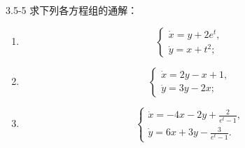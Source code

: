 \documentclass[UTF8,a4paper,11pt]{ctexart}
\begin{document}
\begin{problem}{3.5-5}
求下列各方程组的通解：
  \begin{enumerate}[label=(\arabic*)]
    \item
    \[
    \begin{cases}
      \dot x=y+2e^t,\\
      \dot y=x+t^2;
    \end{cases}
    \]

    \item
    \[
    \begin{cases}
      \dot x=2y-x+1,\\
      \dot y=3y-2x;
    \end{cases}
    \]

    \item
    \[
    \begin{cases}
      \displaystyle \dot x=-4x-2y+\frac{2}{e^t-1},\\[8pt]
      \displaystyle \dot y=6x+3y-\frac{3}{e^t-1}.
    \end{cases}
    \]
  \end{enumerate}
\end{problem}
\end{document}
